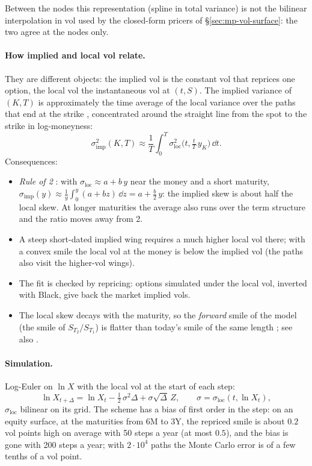 Between the nodes this representation (spline in total variance) is not the bilinear interpolation in vol used by the
closed-form pricers of \S\ref{sec:mp-vol-surface}: the two agree at the nodes only.

\paragraph{How implied and local vol relate.} They are different objects: the implied vol is the constant vol that
reprices one option, the local vol the instantaneous vol at $(t, S)$. The implied variance of $(K, T)$ is approximately
the time average of the local variance over the paths that end at the strike \citep[eqs.~3.8--3.11]{gatheral2006},
concentrated around the straight line from the spot to the strike in log-moneyness:
\[
  \sigma_{\mathrm{imp}}^2(K, T) \approx \frac1T\int_0^T \sigma_{\mathrm{loc}}^2\big(t, \tfrac tT\,y_K\big)\,\dd t .
\]
Consequences:
\begin{itemize}[nosep]
  \item \emph{Rule of 2} \citep{derman1996}: with $\sigma_{\mathrm{loc}} \approx a + b\,y$ near the money and a short maturity,
        $\sigma_{\mathrm{imp}}(y) \approx \frac1y\int_0^y (a + b z)\,\dd z = a + \frac b2\,y$: the implied skew is about half the local skew. At longer
        maturities the average also runs over the term structure and the ratio moves away from 2.
  \item A steep short-dated implied wing requires a much higher local vol there; with a convex smile the local vol at
        the money is below the implied vol (the paths also visit the higher-vol wings).
  \item The fit is checked by repricing: options simulated under the local vol, inverted with Black, give back the
        market implied vols.
  \item The local skew decays with the maturity, so the \emph{forward} smile of the model (the smile of $S_{T_2}/S_{T_1}$) is
        flatter than today's smile of the same length \citep[ch.~3 and 8]{gatheral2006}; see also \citet{derman2016}.
\end{itemize}

\paragraph{Simulation.} Log-Euler on $\ln X$ with the local vol at the start of each step:
\[
  \ln X_{t+\Delta} = \ln X_t - \tfrac12\,\sigma^2\Delta + \sigma\sqrt\Delta\,Z,\qquad \sigma = \sigma_{\mathrm{loc}}(t, \ln X_t),
\]
$\sigma_{\mathrm{loc}}$ bilinear on its grid. The scheme has a bias of first order in the step: on an equity surface, at the maturities
from 6M to 3Y, the repriced smile is about $0.2$ vol points high on average with 50 steps a year (at most $0.5$), and the bias
is gone with 200 steps a year; with $2\cdot10^4$ paths the Monte Carlo error is of a few tenths of a vol point.

